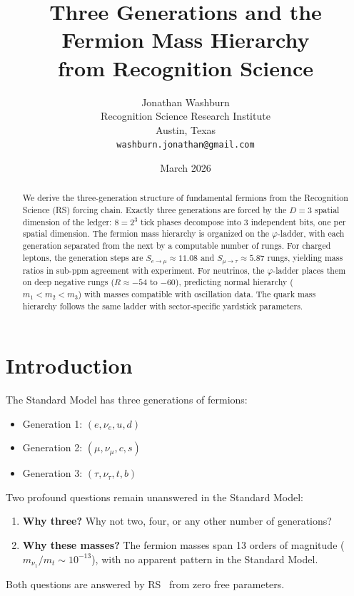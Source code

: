 \documentclass[12pt,a4paper]{article}
\title{Three Generations and the Fermion Mass Hierarchy\\
from Recognition Science}
\author{Jonathan Washburn\\
Recognition Science Research Institute\\
Austin, Texas\\
\texttt{washburn.jonathan@gmail.com}}
\date{March 2026}
\theoremstyle{definition}
\theoremstyle{remark}
\begin{document}
\maketitle

\begin{abstract}
We derive the three-generation structure of fundamental fermions
from the Recognition Science (RS) forcing chain.  Exactly three
generations are forced by the $D = 3$ spatial dimension of the
ledger: $8 = 2^3$ tick phases decompose into 3 independent
bits, one per spatial dimension.  The fermion mass hierarchy is
organized on the $\varphi$-ladder, with each generation
separated from the next by a computable number of rungs.  For
charged leptons, the generation steps are
$S_{e \to \mu} \approx 11.08$ and
$S_{\mu \to \tau} \approx 5.87$ rungs, yielding mass ratios
in sub-ppm agreement with experiment.  For neutrinos, the
$\varphi$-ladder places them on deep negative rungs
($R \approx -54$ to $-60$), predicting normal hierarchy
($m_1 < m_2 < m_3$) with masses compatible with oscillation
data.  The quark mass hierarchy follows the same ladder with
sector-specific yardstick parameters.
\end{abstract}

\section{Introduction}
\label{sec:intro}

The Standard Model has three generations of fermions:
\begin{itemize}
  \item Generation 1: $(e, \nu_e, u, d)$
  \item Generation 2: $(\mu, \nu_\mu, c, s)$
  \item Generation 3: $(\tau, \nu_\tau, t, b)$
\end{itemize}
Two profound questions remain unanswered in the Standard Model:
\begin{enumerate}
  \item \textbf{Why three?}  Why not two, four, or any other
  number of generations?
  \item \textbf{Why these masses?}  The fermion masses span
  13 orders of magnitude ($m_{\nu_1}/m_t \sim 10^{-13}$),
  with no apparent pattern in the Standard Model.
\end{enumerate}
Both questions are answered by RS~\cite{RS_Axioms} from zero
free parameters.
\end{document}
